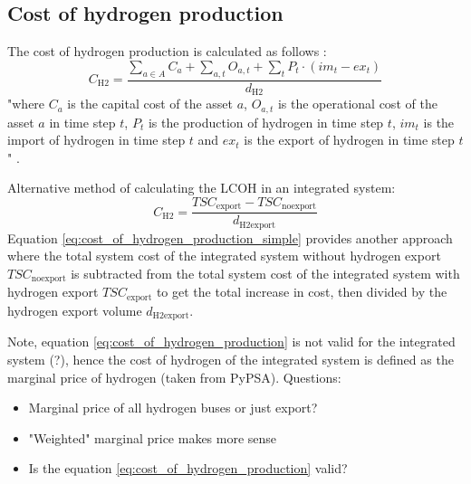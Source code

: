 \subsection{Cost of hydrogen production}
\label{subsec:cost_of_hydrogen_production}

The cost of hydrogen production is calculated as follows \cite{Zeyen2022}:
\begin{equation}
    \label{eq:cost_of_hydrogen_production}
    C_\mathrm{H2}= \frac{\sum \limits_{a\in A}^{} C_a + \sum \limits_{a,t} O_{a,t} + \sum \limits_{t} P_t \cdot (im_t - ex_t)   }{d_\mathrm{H2}}
\end{equation}
"where $C_a$ is the capital cost of the asset $a$, $O_{a,t}$ is the operational cost of the asset $a$ in time step $t$, $P_t$ is the production of hydrogen in time step $t$, $im_t$ is the import of hydrogen in time step $t$ and $ex_t$ is the export of hydrogen in time step $t$" \cite{Zeyen2022}.


Alternative method of calculating the LCOH in an integrated system:
\begin{equation}
    \label{eq:cost_of_hydrogen_production_simple}
    C_\mathrm{H2}=\frac{TSC_\mathrm{export}-TSC_\mathrm{noexport}}{d_\mathrm{H2export}}
\end{equation}
Equation \ref{eq:cost_of_hydrogen_production_simple} provides another approach where the total system cost of the integrated system without hydrogen export $TSC_\mathrm{noexport}$ is subtracted from the total system cost of the integrated system with hydrogen export $TSC_\mathrm{export}$ to get the total increase in cost, then divided by the hydrogen export volume $d_\mathrm{H2export}$.

Note, equation \ref{eq:cost_of_hydrogen_production} is not valid for the integrated system (?),
hence the cost of hydrogen of the integrated system is defined as the marginal price of hydrogen (taken from PyPSA).
Questions:
\begin{itemize}
    \item Marginal price of all hydrogen buses or just export?
    \item "Weighted" marginal price makes more sense
    \item Is the equation \ref{eq:cost_of_hydrogen_production} valid?
\end{itemize}


